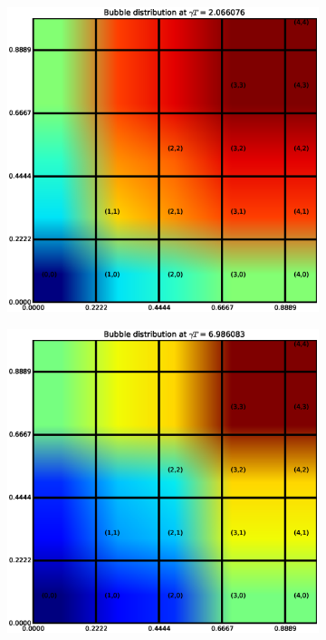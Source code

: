 \begin{figure}
\begin{subfigure}[b]{0.32\textwidth}
  \includegraphics[width=\textwidth]{figs/spatial_bubble-1}
\end{subfigure}
\begin{subfigure}[b]{0.32\textwidth}
  \includegraphics[width=\textwidth]{figs/spatial_bubble-17}

\end{subfigure}
\end{figure}

